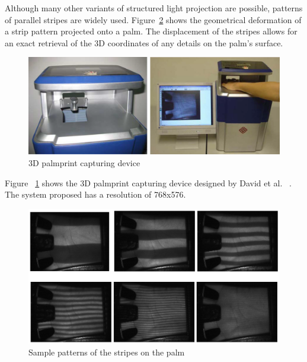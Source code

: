 Although many other variants of structured light projection are possible, patterns of parallel stripes are widely used. Figure~\ref{fig:pastwork:strippattern} shows the geometrical deformation of a strip pattern projected onto a palm. The displacement of the stripes allows for an exact retrieval of the 3D coordinates of any details on the palm's surface.

\begin{figure}[htb]
  \begin{center}
    \includegraphics[width=0.9\linewidth]{ch-pastwork/figures/device}
    \caption{3D palmprint capturing device}
    \label{fig:pastwork:device}
  \end{center}
\end{figure}

Figure ~\ref{fig:pastwork:device} shows the 3D palmprint capturing device designed by David et al. ~\cite{Zhang:2008kc}. The system proposed has a resolution of 768x576.

\begin{figure}[htb]
  \begin{center}
    \includegraphics[width=0.9\linewidth]{ch-pastwork/figures/strippattern}
    \caption[Sample patterns of the stripes on the palm]{Sample patterns of the stripes on the palm~\cite{Li:2009eq}}
    \label{fig:pastwork:strippattern}
  \end{center}
\end{figure}

